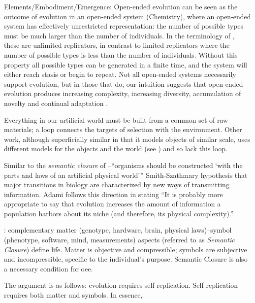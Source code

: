 Elements/Embodiment/Emergence:
Open-ended evolution can be seen as the outcome of evolution in an open-ended system (\eg Chemistry), where an open-ended system has effectively unrestricted representation: the number of possible types must be much larger than the number of individuals. In the terminology of \cite{Szathmary:2006ty}, these are unlimited replicators, in contrast to limited replicators where the number of possible types is less than the number of individuals. Without this property all possible types can be generated in a finite time, and the system will either reach stasis or begin to repeat. Not all open-ended systems necessarily support evolution, but in those that do, our intuition suggests that open-ended evolution produces increasing complexity, increasing diversity, accumulation of novelty and continual adaptation \parencite{Lehman2012}.

Everything in our artificial world must be built from a common set of raw materials; a loop connects the targets of selection with the environment. Other work, although superficially similar in that it models objects of similar scale, uses different models for the objects and the world (see \parencite{Sanchez-Dehesa:2008uq}) and so lack this loop.

Similar to the \emph{semantic closure} of \cite{Pattee1995a}--``organisms should be constructed `with the parts and laws of an artificial physical world''' \cite{Taylor2001}
Smith-Szathmary hypothesis that major transitions in biology are characterized by new ways of transmitting information. Adami follows this direction in stating ``It is probably more appropriate to say that evolution increases the amount of information a population harbors about its niche (and therefore, its physical complexity).'' \cite{Adami2002}

\cite{Pattee1995a}: complementary matter (\eg genotype, hardware, brain, physical laws)--symbol (\eg phenotype, software, mind, measurements) aspects (referred to as \textit{Semantic Closure}) define life. Matter is objective and compressible; symbols are subjective and incompressible, specific to the individual's purpose. Semantic Closure is also a necessary condition for \gls{oee}. \Textcite{VonNeumann1966}

The argument is as follows: evolution requires self-replication. Self-replication requires both matter and symbols. In essence,  

